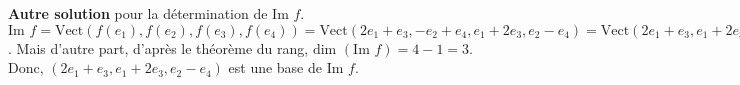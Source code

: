 {{\begin{center}
\end{center}

\textbf{Autre solution} pour la détermination de $\mbox{Im }f$.
$\mbox{Im }f=\mbox{Vect}(f(e_1),f(e_2),f(e_3),f(e_4))=\mbox{Vect}(2e_1+e_3,-e_2+e_4,e_1+2e_3,e_2-e_4)
=\mbox{Vect}(2e_1+e_3,e_1+2e_3,e_2-e_4)$. Mais d'autre part, d'après le théorème du rang,
$\mbox{dim }(\mbox{Im }f)=4-1=3$. Donc, $(2e_1+e_3,e_1+2e_3,e_2-e_4)$ est une base de $\mbox{Im }f$.
}
}
